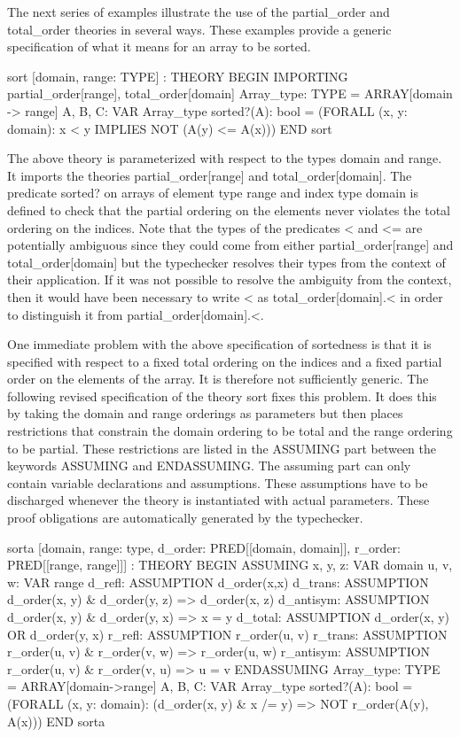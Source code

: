 The next series of examples illustrate the use of the {\stt
partial\_order} and {\stt total\_order} theories in several ways.  These
examples provide a generic specification of what it means for an array
to be sorted.
\begin{pvsex}
  sort [domain, range: TYPE] : THEORY
   BEGIN
    IMPORTING partial\_order[range], total\_order[domain]
    Array\_type: TYPE = ARRAY[domain -> range]
    A, B, C: VAR Array\_type
    sorted?(A): bool =
      (FORALL (x, y: domain): x < y IMPLIES NOT (A(y) <= A(x)))
   END sort
\end{pvsex}
%
The above theory is parameterized with respect to the types {\stt
domain} and {\stt range}.  It imports the theories {\stt
partial\_order[range]} and {\stt total\_order[domain]}.  The predicate
{\stt sorted?} on arrays of element type {\stt range} and index type
{\stt domain} is defined to check that the partial ordering on the
elements never violates the total ordering on the indices.  Note that
the types of the predicates {\stt <} and {\stt <=} are potentially
ambiguous since
they could come from either {\stt partial\_order[range]} and {\stt
total\_order[domain]} but the typechecker resolves their types from the
context of their application.  If it was not possible to resolve the
ambiguity from the context, then it would have been necessary to write
{\stt <} as {\stt total\_order[domain].<} in order to distinguish it
from {\stt partial\_order[domain].<}.

One immediate problem with the above specification of sortedness is that
it is specified with respect to a fixed total ordering on the indices
and a fixed partial order on the elements of the array.  It is therefore
not sufficiently generic.  The following revised specification of the
theory {\stt sort} fixes this problem.  It does this by taking the domain
and range orderings as parameters but then places restrictions that
constrain the domain ordering to be total and the range ordering to be
partial.  These restrictions are listed in the {\stt ASSUMING} part
between the keywords {\stt ASSUMING} and {\stt ENDASSUMING}.  The assuming
part can only contain variable declarations and assumptions.  These
assumptions have to be discharged whenever the theory is instantiated
with actual parameters.  These proof obligations are automatically
generated by the typechecker.
\begin{pvsex}
  sorta [domain, range: type, 
         d\_order: PRED[[domain, domain]],
         r\_order: PRED[[range, range]]] : THEORY
   BEGIN
    ASSUMING
     x, y, z: VAR domain
     u, v, w: VAR range
     d\_refl: ASSUMPTION d\_order(x,x)
     d\_trans: ASSUMPTION  d\_order(x, y) \& d\_order(y, z) => d\_order(x, z)
     d\_antisym: ASSUMPTION d\_order(x, y) \& d\_order(y, x) => x = y
     d\_total: ASSUMPTION  d\_order(x, y) OR d\_order(y, x)
     r\_refl: ASSUMPTION r\_order(u, v)
     r\_trans: ASSUMPTION  r\_order(u, v) \& r\_order(v, w) => r\_order(u, w)
     r\_antisym: ASSUMPTION r\_order(u, v) \& r\_order(v, u) => u = v
    ENDASSUMING
    Array\_type: TYPE = ARRAY[domain->range]
    A, B, C: VAR Array\_type
    sorted?(A): bool =
      (FORALL (x, y: domain):
         (d\_order(x, y) \& x /= y) => NOT r\_order(A(y), A(x)))
   END sorta
\end{pvsex}

